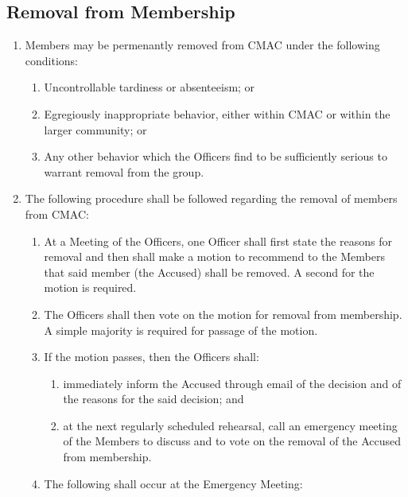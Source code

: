 \documentclass{article}
\begin{document}
\subsection{Removal from Membership}
\begin{enumerate}
\item Members may be permenantly removed from CMAC under the following conditions:

\begin{enumerate}
\item Uncontrollable tardiness or absenteeism; or
\item Egregiously inappropriate behavior, either within CMAC or within the
larger community; or
\item Any other behavior which the Officers find to be sufficiently serious
to warrant removal from the group.
\end{enumerate}
\item The following procedure shall be followed regarding the removal of
members from CMAC:

\begin{enumerate}
\item At a Meeting of the Officers, one Officer shall first state the reasons
for removal and then shall make a motion to recommend to the Members
that said member (the Accused) shall be removed. A second for the
motion is required.
\item The Officers shall then vote on the motion for removal from membership.
A simple majority is required for passage of the motion.
\item If the motion passes, then the Officers shall:

\begin{enumerate}
\item immediately inform the Accused through email of the decision and of
the reasons for the said decision; and
\item at the next regularly scheduled rehearsal, call an emergency meeting
of the Members to discuss and to vote on the removal of the Accused
from membership.
\end{enumerate}
\item The following shall occur at the Emergency Meeting:


\end{enumerate}
\end{enumerate}
\end{document}
